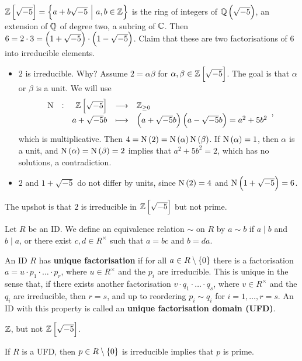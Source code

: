 \begin{example*}
$ \ZZ\sbr{\sqrt{-5}} = \cbr{a + b\sqrt{-5} \st a, b \in \ZZ} $ is the ring of integers of $ \QQ\br{\sqrt{-5}} $, an extension of $ \mathbb{Q} $ of degree two, a subring of $ \mathbb{C} $. Then $ 6 = 2 \cdot 3 = \br{1 + \sqrt{-5}} \cdot \br{1 - \sqrt{-5}} $. Claim that these are two factorisations of $ 6 $ into irreducible elements.
\begin{itemize}
\item $ 2 $ is irreducible. Why? Assume $ 2 = \alpha\beta $ for $ \alpha, \beta \in \ZZ\sbr{\sqrt{-5}} $. The goal is that $ \alpha $ or $ \beta $ is a unit. We will use
$$ \function[\N]{\ZZ\sbr{\sqrt{-5}}}{\ZZ_{\ge 0}}{a + \sqrt{-5}b}{\br{a + \sqrt{-5}b}\br{a - \sqrt{-5}b} = a^2 + 5b^2}, $$
which is multiplicative. Then $ 4 = \N\br{2} = \N\br{\alpha}\N\br{\beta} $. If $ \N\br{\alpha} = 1 $, then $ \alpha $ is a unit, and $ \N\br{\alpha} = \N\br{\beta} = 2 $ implies that $ a^2 + 5b^2 = 2 $, which has no solutions, a contradiction.
\item $ 2 $ and $ 1 + \sqrt{-5} $ do not differ by units, since $ \N\br{2} = 4 $ and $ \N\br{1 + \sqrt{-5}} = 6 $.
\end{itemize}
The upshot is that $ 2 $ is irreducible in $ \ZZ\sbr{\sqrt{-5}} $ but not prime.
\end{example*}

Let $ R $ be an ID. We define an equivalence relation $ \sim $ on $ R $ by $ a \sim b $ if $ a \mid b $ and $ b \mid a $, or there exist $ c, d \in R^\times $ such that $ a = bc $ and $ b = da $.

\begin{definition}
An ID $ R $ has \textbf{unique factorisation} if for all $ a \in R \setminus \cbr{0} $ there is a factorisation $ a = u \cdot p_1 \cdot \dots \cdot p_r $, where $ u \in R^\times $ and the $ p_i $ are irreducible. This is unique in the sense that, if there exists another factorisation $ v \cdot q_1 \cdot \dots \cdot q_s $, where $ v \in R^\times $ and the $ q_i $ are irreducible, then $ r = s $, and up to reordering $ p_i \sim q_i $ for $ i = 1, \dots, r = s $. An ID with this property is called an \textbf{unique factorisation domain (UFD)}.
\end{definition}

\begin{example*}
$ \mathbb{Z} $, but not $ \ZZ\sbr{\sqrt{-5}} $.
\end{example*}

\begin{lemma}
If $ R $ is a UFD, then $ p \in R \setminus \cbr{0} $ is irreducible implies that $ p $ is prime.
\end{lemma}

